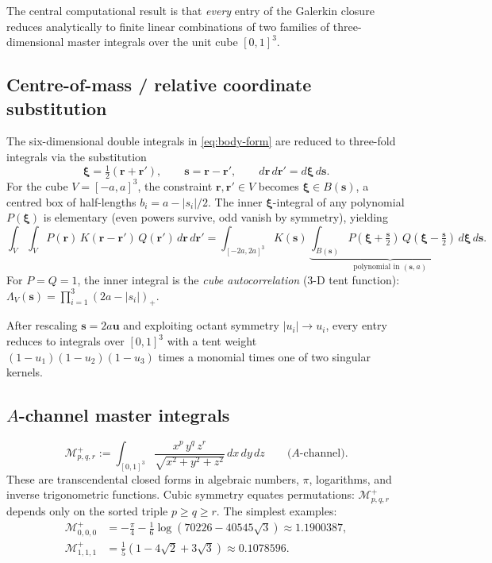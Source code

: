 \documentclass[11pt,a4paper]{article}
\newcommand{\bs}{\bm{s}}
\newcommand{\br}{\bm{r}}
\newcommand{\bxi}{\bm{\xi}}
\newcommand{\bu}{\bm{u}}
\theoremstyle{plain}
\theoremstyle{definition}
\theoremstyle{remark}
\begin{document}
The central computational result is that \emph{every} entry of the
Galerkin closure reduces analytically to finite linear combinations of
two families of three-dimensional master integrals over the unit cube
$[0,1]^3$.

\subsection{Centre-of-mass / relative coordinate substitution}
\label{sec:cm-relative}

The six-dimensional double integrals in \eqref{eq:body-form} are
reduced to three-fold integrals via the substitution
\begin{equation}
  \bxi = \tfrac{1}{2}(\br + \br'),\qquad \bs = \br - \br',
  \qquad d\br\,d\br' = d\bxi\,d\bs.
  \label{eq:cm-sub}
\end{equation}
For the cube $V = [-a,a]^3$, the constraint $\br,\br' \in V$ becomes
$\bxi \in B(\bs)$, a centred box of half-lengths
$b_i = a - |s_i|/2$.  The inner $\bxi$-integral of any polynomial
$P(\bxi)$ is elementary (even powers survive, odd vanish by symmetry),
yielding
\begin{equation}
  \int_V\!\!\int_V P(\br)\,K(\br-\br')\,Q(\br')\,d\br\,d\br'
  = \int_{[-2a,2a]^3}\!K(\bs)\,
    \underbrace{\int_{B(\bs)} P(\bxi+\tfrac{\bs}{2})\,
    Q(\bxi-\tfrac{\bs}{2})\,d\bxi}_{\text{polynomial in }(\bs,a)}\,d\bs.
  \label{eq:cm-reduction}
\end{equation}
For $P = Q = 1$, the inner integral is the \emph{cube autocorrelation}
(3-D tent function): $\Lambda_V(\bs) = \prod_{i=1}^3 (2a - |s_i|)_+$.

After rescaling $\bs = 2a\bu$ and exploiting octant symmetry
$|u_i| \to u_i$, every entry reduces to integrals over $[0,1]^3$
with a tent weight $(1-u_1)(1-u_2)(1-u_3)$ times a monomial times
one of two singular kernels.

\subsection{$A$-channel master integrals}
\label{sec:tier1}

\begin{equation}
  \mathcal{M}^+_{p,q,r}
  := \int_{[0,1]^3}\!\frac{x^p\,y^q\,z^r}
    {\sqrt{x^2+y^2+z^2}}\,dx\,dy\,dz
  \qquad\text{($A$-channel)}.
  \label{eq:Mp-def}
\end{equation}
These are transcendental closed forms in algebraic numbers, $\pi$,
logarithms, and inverse trigonometric functions.  Cubic symmetry
equates permutations: $\mathcal{M}^+_{p,q,r}$ depends only on the
sorted triple $p \ge q \ge r$.  The simplest examples:
\begin{align}
  \mathcal{M}^+_{0,0,0}
    &= -\frac{\pi}{4} - \frac{1}{6}\log(70226 - 40545\sqrt{3})
    \approx 1.1900387,\label{eq:Mp000}\\
  \mathcal{M}^+_{1,1,1}
    &= \tfrac{1}{5}(1 - 4\sqrt{2} + 3\sqrt{3})
    \approx 0.1078596.\label{eq:Mp111}
\end{align}
\end{document}
